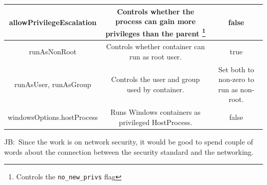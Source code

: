 \documentclass[english, 12pt, a4paper, sci, utf8, a-2b, online]{aaltothesis}
\newcommand{\mycomment}[3]{\textcolor{#1}{#2:~#3}}
\newcommand{\jb}[1]{\noindent\mycomment{aaltoRed}{JB}{#1}}
\begin{document}
\begin{table}[H]
\begin{minipage}{\textwidth}
\begin{tabularx}{\textwidth}{CCC}
    allowPrivilegeEscalation & Controls whether the process can gain more privileges than the parent \footnote{Controls the \texttt{no\_new\_privs} flag} & false \\ \hline
    runAsNonRoot & Controls whether container can run as root user. & true \\ \hline
    runAsUser, runAsGroup & Controls the user and group used by container. & Set both to non-zero to run as non-root. \\ \hline
    windowsOptions.hostProcess & Runs Windows containers as privileged HostProcess. & false \\ \hline
  \end{tabularx}
  \end{minipage}
\end{table}



\jb{Since the work is on network security, it would be good to spend couple of words about the connection between the security standard and the networking.}



\end{document}
